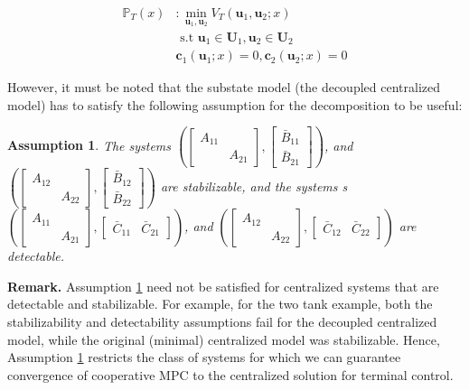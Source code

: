 \documentclass[10pt, twocolumn]{article}
\newcommand{\bu}{\mathbf{u}}
\newtheorem{assumption}{Assumption}
\theoremstyle{definition}
\begin{document}
\begin{align*} \mathbb{P}_T(x)&: \min_{\bu_1,\bu_2}{V_T(\bu_1,\bu_2;x)} \\&\text{~s.t~}  \mathbf{u}_1 \in \mathbf{U}_1, \mathbf{u}_2 \in \mathbf{U}_2 \\ &\mathbf{c}_1(\bu_1;x) = 0, \mathbf{c}_2(\bu_2;x) = 0 \end{align*}

However, it must be noted that the substate model (the decoupled centralized model) has to satisfy the following assumption for the decomposition to be useful:
\begin{assumption}
\label{ass:cross_stab}
The systems $(\begin{bmatrix}A_{11}&\\&A_{21}\end{bmatrix},\begin{bmatrix}\bar{B}_{11}\\\bar{B}_{21}\end{bmatrix})$, and  $(\begin{bmatrix}A_{12}&\\&A_{22}\end{bmatrix},\begin{bmatrix}\bar{B}_{12}\\\bar{B}_{22}\end{bmatrix})$ are stabilizable, and the systems s $(\begin{bmatrix}A_{11}&\\&A_{21}\end{bmatrix},\begin{bmatrix}\bar{C}_{11}&\bar{C}_{21}\end{bmatrix})$, and  $(\begin{bmatrix}A_{12}&\\&A_{22}\end{bmatrix},\begin{bmatrix}\bar{C}_{12}&\bar{C}_{22}\end{bmatrix})$ are detectable.
\end{assumption}

{\textbf{Remark.}} Assumption \ref{ass:cross_stab} need not be satisfied for centralized systems that are detectable and stabilizable. For example, for the two tank example, both the stabilizability and detectability assumptions fail for the decoupled centralized model, while the original (minimal) centralized model was stabilizable. Hence, Assumption \ref{ass:cross_stab} restricts the class of systems for which we can guarantee convergence of cooperative MPC to the centralized solution for terminal control.
\end{document}
